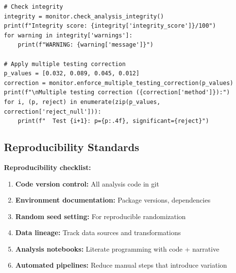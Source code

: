 \begin{lstlisting}
# Check integrity
integrity = monitor.check_analysis_integrity()
print(f"Integrity score: {integrity['integrity_score']}/100")
for warning in integrity['warnings']:
    print(f"WARNING: {warning['message']}")

# Apply multiple testing correction
p_values = [0.032, 0.089, 0.045, 0.012]
correction = monitor.enforce_multiple_testing_correction(p_values)
print(f"\nMultiple testing correction ({correction['method']}):")
for i, (p, reject) in enumerate(zip(p_values, correction['reject_null'])):
    print(f"  Test {i+1}: p={p:.4f}, significant={reject}")
\end{lstlisting}

\subsection{Reproducibility Standards}

\textbf{Reproducibility checklist:}

\begin{enumerate}
    \item \textbf{Code version control:} All analysis code in git

    \item \textbf{Environment documentation:} Package versions, dependencies

    \item \textbf{Random seed setting:} For reproducible randomization

    \item \textbf{Data lineage:} Track data sources and transformations

    \item \textbf{Analysis notebooks:} Literate programming with code + narrative

    \item \textbf{Automated pipelines:} Reduce manual steps that introduce variation
\end{enumerate}

